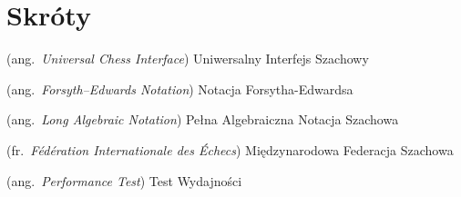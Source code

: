 %
\chapter*{Skróty}
\label{sec:skroty}
\noindent\vspace{-\topsep-\partopsep-\parsep} %
\begin{description}[labelwidth=*]
  \item [UCI] (ang.\ \emph{Universal Chess Interface}) Uniwersalny Interfejs Szachowy
  \item [FEN] (ang.\ \emph{Forsyth–Edwards Notation}) Notacja Forsytha-Edwardsa
  \item [LAN] (ang.\ \emph{Long Algebraic Notation}) Pełna Algebraiczna Notacja Szachowa
  \item [FIDE] (fr.\ \emph{Fédération Internationale des Échecs}) Międzynarodowa Federacja Szachowa
  \item [Perft] (ang.\ \emph{Performance Test}) Test Wydajności
\end{description}



